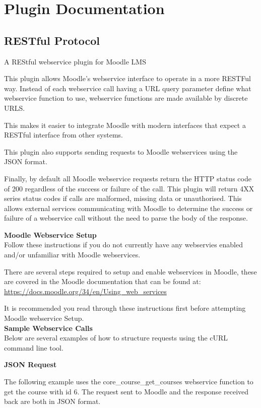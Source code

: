 \clearpage
\section{Plugin Documentation}

\subsection{RESTful Protocol}
A REStful webservice plugin for Moodle LMS

This plugin allows Moodle's webservice interface to operate in a more RESTFul way.
Instead of each webservice call having a URL query parameter define what webservice function to use, webservice functions are made available by discrete URLS.

This makes it easier to integrate Moodle with modern interfaces that expect a RESTful interface from other systems.

This plugin also supports sending requests to Moodle webservices using the JSON format.

Finally, by default all Moodle webservice requests return the HTTP status code of 200 regardless of the success or failure of the call. This plugin will return 4XX series status codes if calls are malformed, missing data or unauthorised. This allows external services communicating with Moodle to determine the success or failure of a webservice call without the need to parse the body of the response.

\textbf{Moodle Webservice Setup}\\
Follow these instructions if you do not currently have any webservies enabled and/or unfamiliar with Moodle webservices.

There are several steps required to setup and enable webservices in Moodle, these are covered in the Moodle documentation that can be found at: \href{https://docs.moodle.org/34/en/Using_web_services}{https://docs.moodle.org/34/en/Using\_web\_services}

It is recommended you read through these instructions first before attempting Moodle webservice Setup.\\

\textbf{Sample Webservice Calls}\\
Below are several examples of how to structure requests using the cURL command line tool.

\textbf{JSON Request}

The following example uses the core\_course\_get\_courses webservice function to get the course with id 6. The request sent to Moodle and the response received back are both in JSON format.

